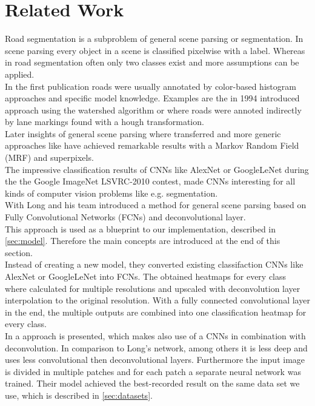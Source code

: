 
\section{Related Work}\label{sec:related-work}
Road segmentation is a subproblem of general scene parsing or segmentation. In scene parsing every object in a scene is classified pixelwise with a label. Whereas in road segmentation often only two classes exist and more assumptions can be applied.\\
In the first publication roads were usually annotated by color-based histogram approaches and specific model knowledge. Examples are the in 1994 introduced approach \cite{Beucher1990} using the watershed algorithm or \cite{aly2008real} where roads were annoted indirectly by lane markings found with a hough transformation.\\
Later insights of general scene parsing where transferred and more generic approaches like \cite{6182716} have achieved remarkable results with a Markov Random Field (MRF) and superpixels.\\
The impressive classification results of CNNs like AlexNet \cite{krizhevsky2012imagenet} or GoogleLeNet \cite{SzegedyLJSRAEVR14} during the the Google ImageNet LSVRC-2010 contest, made CNNs interesting for all kinds of computer vision problems like e.g. segmentation. \\
With \cite{long2014fully} Long and his team introduced a method for general scene parsing based on Fully Convolutional Networks (FCNs) and deconvolutional layer.\\
This approach is used as a blueprint to our implementation, described in \cref{sec:model}. Therefore the main concepts are introduced at the end of this section.\\
Instead of creating a new model, they converted existing classifaction CNNs like AlexNet or GoogleLeNet into FCNs. The obtained heatmaps for every class where calculated for multiple resolutions and upscaled with deconvolution layer interpolation to the original resolution.
With a fully connected convolutional layer in the end, the multiple outputs are combined into one classification heatmap for every class.\\

In \cite{mohan2014deep} a approach is presented, which makes also use of a CNNs in combination with deconvolution. In comparison to Long's network, among others it is less deep and uses less convolutional then deconvolutional layers. Furthermore the input image is divided in multiple patches and for each patch a separate neural network was trained. Their model achieved the best-recorded result on the same data set we use, which is described in \cref{sec:datasets}.    

